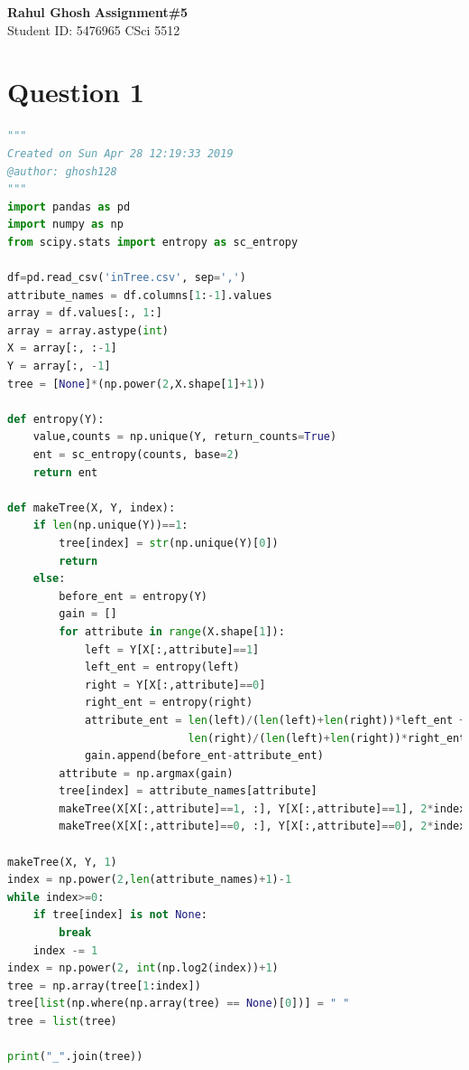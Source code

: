 \documentclass[letter, 10pt]{article}
\begin{document}
\noindent
\large \textbf{Rahul Ghosh} \hfill \textbf{Assignment\#5}\\
\normalsize Student ID: 5476965 \hfill CSci 5512\\

\section*{Question 1}
\begin{lstlisting}[language=Python]
"""
Created on Sun Apr 28 12:19:33 2019
@author: ghosh128
"""
import pandas as pd
import numpy as np
from scipy.stats import entropy as sc_entropy

df=pd.read_csv('inTree.csv', sep=',')
attribute_names = df.columns[1:-1].values
array = df.values[:, 1:]
array = array.astype(int)
X = array[:, :-1]
Y = array[:, -1]
tree = [None]*(np.power(2,X.shape[1]+1))

def entropy(Y):
    value,counts = np.unique(Y, return_counts=True)
    ent = sc_entropy(counts, base=2)
    return ent

def makeTree(X, Y, index):
    if len(np.unique(Y))==1:
        tree[index] = str(np.unique(Y)[0])
        return
    else:
        before_ent = entropy(Y)
        gain = []
        for attribute in range(X.shape[1]):
            left = Y[X[:,attribute]==1]
            left_ent = entropy(left)
            right = Y[X[:,attribute]==0]
            right_ent = entropy(right)
            attribute_ent = len(left)/(len(left)+len(right))*left_ent +
                            len(right)/(len(left)+len(right))*right_ent
            gain.append(before_ent-attribute_ent)
        attribute = np.argmax(gain)
        tree[index] = attribute_names[attribute]
        makeTree(X[X[:,attribute]==1, :], Y[X[:,attribute]==1], 2*index)
        makeTree(X[X[:,attribute]==0, :], Y[X[:,attribute]==0], 2*index + 1)

makeTree(X, Y, 1)
index = np.power(2,len(attribute_names)+1)-1
while index>=0:
    if tree[index] is not None:
        break
    index -= 1
index = np.power(2, int(np.log2(index))+1)
tree = np.array(tree[1:index])
tree[list(np.where(np.array(tree) == None)[0])] = " "
tree = list(tree)

print("_".join(tree))
\end{lstlisting}
\newpage
\end{document}
